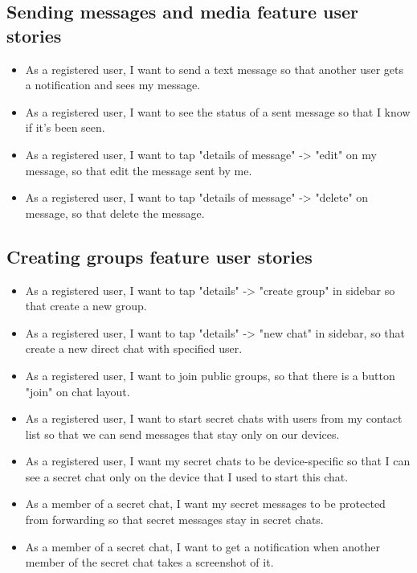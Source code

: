 \subsection{Sending messages and media feature user stories}\label{subsec:sending-messages-and-media-feature-user-stories}
\begin{itemize}
    \item As a registered user, I want to send a text message so that another user gets a notification and sees my message.
    \item As a registered user, I want to see the status of a sent message so that I know if it’s been seen.
    \item As a registered user, I want to tap "details of message" -> "edit" on my message, so that edit the message sent by me.
    \item As a registered user, I want to tap "details of message" -> "delete" on message, so that delete the message.
\end{itemize}

\subsection{Creating groups feature user stories}\label{subsec:creating-groups-feature-user-stories}
\begin{itemize}
    \item As a registered user, I want to tap "details" -> "create group" in sidebar so that create a new group.
    \item As a registered user, I want to tap "details" -> "new chat" in sidebar, so that create a new direct chat with specified user.
    \item As a registered user, I want to join public groups, so that there is a button "join" on chat layout.
    \item As a registered user, I want to start secret chats with users from my contact list so that we can send messages that stay only on our devices.
    \item As a registered user, I want my secret chats to be device-specific so that I can see a secret chat only on the device that I used to start this chat.
    \item As a member of a secret chat, I want my secret messages to be protected from forwarding so that secret messages stay in secret chats.
    \item As a member of a secret chat, I want to get a notification when another member of the secret chat takes a screenshot of it.
\end{itemize}

